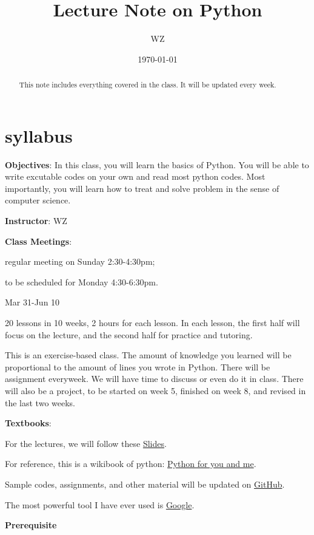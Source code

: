 \documentclass[aps,prb,12pt,tightenlines,%
notitlepage,longbibliography]{revtex4-1}
\begin{document}
\title{Lecture Note on Python}
\author{WZ}
\date{\today}
\begin{abstract}
  This note includes everything covered in the class. It will be
  updated every week.
\end{abstract}
\maketitle

\section{syllabus}
\textbf{Objectives}: In this class, you will learn the basics of
Python. You will be able to write excutable codes on your own and read
most python codes. Most importantly, you will learn how to treat and
solve problem in the sense of computer science.


\textbf{Instructor}: WZ

\textbf{Class Meetings}:

regular meeting on Sunday 2:30-4:30pm;

to be scheduled for Monday 4:30-6:30pm.

Mar 31-Jun 10

20 lessons in 10 weeks, 2 hours for each lesson. In each lesson, the
first half will focus on the lecture, and the second half for practice
and tutoring.

This is an exercise-based class. The amount of knowledge you learned
will be proportional to the amount of lines you wrote in Python. There
will be assignment everyweek. We will have time to discuss or even do
it in class. There will also be a project, to be started
on week 5, finished on week 8, and revised in the last two weeks. 

\textbf{Textbooks}:

For the lectures, we will follow these
\href{http://uwpce-pythoncert.github.io/IntroPython2016a/session01.html}{Slides}.

For reference, this is a wikibook of python: 
\href{https://pymbook.readthedocs.io/en/latest/index.html}{Python for
  you and me}.

Sample codes, assignments, and other material will be updated on 
\href{https://github.com/WeileiZeng/python-tutorial}{GitHub}.

The most powerful tool I have ever used is \href{https://www.google.com/}{Google}.

\textbf{Prerequisite}
\end{document}
